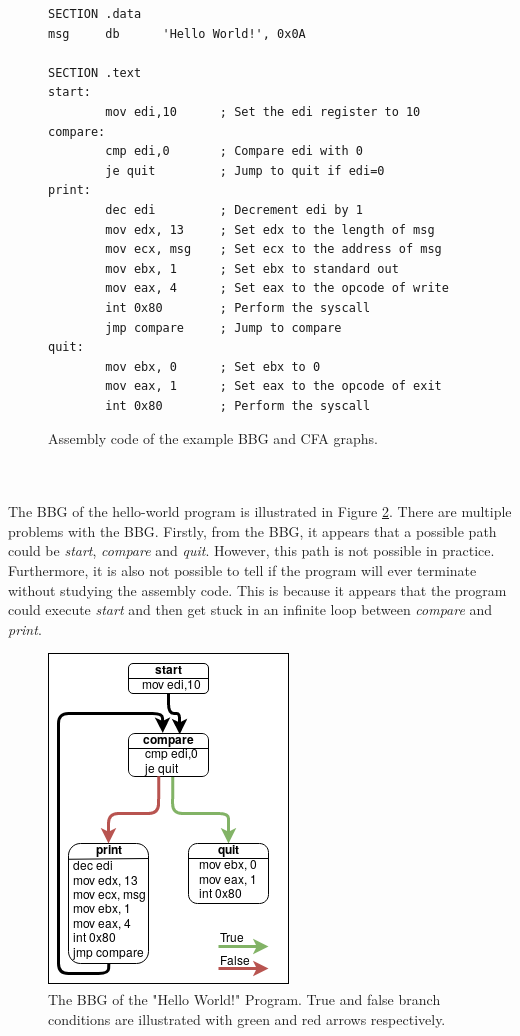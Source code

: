 \documentclass{kththesis}
\renewcommand{\it}[1]{\textit{#1}}
\begin{document}
\begin{figure}[t]
    \centering
\begin{tcolorbox}
\begin{verbatim}
SECTION .data
msg     db      'Hello World!', 0x0A

SECTION .text
start:
        mov edi,10      ; Set the edi register to 10
compare:
        cmp edi,0       ; Compare edi with 0
        je quit         ; Jump to quit if edi=0
print:
        dec edi         ; Decrement edi by 1
        mov edx, 13     ; Set edx to the length of msg
        mov ecx, msg    ; Set ecx to the address of msg
        mov ebx, 1      ; Set ebx to standard out
        mov eax, 4      ; Set eax to the opcode of write
        int 0x80        ; Perform the syscall
        jmp compare     ; Jump to compare
quit:
        mov ebx, 0      ; Set ebx to 0
        mov eax, 1      ; Set eax to the opcode of exit
        int 0x80        ; Perform the syscall
\end{verbatim}
\end{tcolorbox}
\caption[Assembly code of the example BBG and CFA graphs.]{Assembly code of the example BBG and CFA graphs.}
    \label{fig:assembly}
\end{figure}
\noindent
\\ \\
The BBG of the hello-world program is illustrated in Figure \ref{fig:HelloBBG}. There are multiple problems with the BBG. Firstly, from the BBG, it appears that a possible path could be \it{start}, \it{compare} and \it{quit}. However, this path is not possible in practice. Furthermore, it is also not possible to tell if the program will ever terminate without studying the assembly code. This is because it appears that the program could execute \it{start} and then get stuck in an infinite loop between \it{compare} and \it{print}.
\begin{figure}[th]
    \centering
    \includegraphics[scale=0.6]{Images/BBGExample.png}
    \caption[The BBG of the "Hello World!" Program.]{The BBG of the "Hello World!" Program. True and false branch conditions are illustrated with green and red arrows respectively.}
    \label{fig:HelloBBG}
\end{figure}
\end{document}
